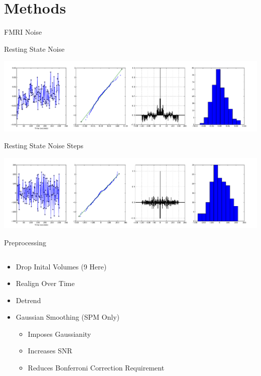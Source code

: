 \documentclass{beamer}
\begin{document}
\section{Methods}
\begin{frame}{FMRI Noise}
\centering

Resting State Noise

\includegraphics[trim=3cm 0cm 3cm 0cm,width=.75\textwidth]{noise2_0009_22_38_23}

Resting State Noise Steps

\includegraphics[trim=3cm 0cm 3cm 0cm,width=.75\textwidth]{noise2_0009d_22_38_23}

\end{frame}

\begin{frame}{Preprocessing}
  \begin{columns}
    \begin{column}{.7\textwidth}
        \begin{itemize}
            \item Drop Inital Volumes (9 Here)
            \item Realign Over Time
            \item Detrend
            \item Gaussian Smoothing (SPM Only)
            \begin{itemize}
                \item Imposes Gaussianity
                \item Increases SNR
                \item Reduces Bonferroni Correction Requirement
            \end{itemize}
        \end{itemize}
    \end{column}
    
    \begin{column}{.3\textwidth}
    \end{column}
  \end{columns}
\end{frame}
\end{document}
